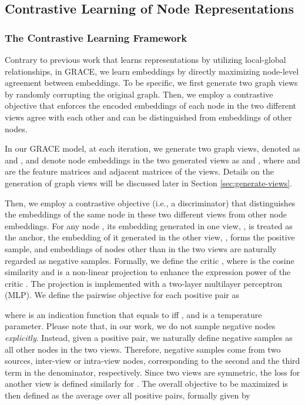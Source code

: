 \documentclass{article}
\theoremstyle{remark}
\begin{document}
\subsection{Contrastive Learning of Node Representations}

\subsubsection{The Contrastive Learning Framework} 

Contrary to previous work that learns representations by utilizing local-global relationships, in GRACE, we learn embeddings by directly maximizing node-level agreement between embeddings.
To be specific, we first generate two graph views by randomly corrupting the original graph. Then, we employ a contrastive objective that enforces the encoded embeddings of each node in the two different views agree with each other and can be distinguished from embeddings of other nodes.





In our GRACE model, at each iteration, we generate two graph views, denoted as  and , and denote node embeddings in the two generated views as  and , where  and  are the feature matrices and adjacent matrices of the views.
Details on the generation of graph views will be discussed later in Section \ref{sec:generate-views}.



Then, we employ a contrastive objective (i.e., a discriminator) that distinguishes the embeddings of the same node in these two different views from other node embeddings. For any node , its embedding generated in one view, , is treated as the anchor, the embedding of it generated in the other view, , forms the positive sample, and embeddings of nodes other than  in the two views are naturally regarded as negative samples. Formally, we define the critic , where  is the cosine similarity and  is a non-linear projection to enhance the expression power of the critic \cite{Chen:2020wj,Tschannen:2020uo}. The projection  is implemented with a two-layer multilayer perceptron (MLP). We define the pairwise objective for each positive pair  as

where  is an indication function that equals to  iff , and  is a temperature parameter. Please note that, in our work, we do not sample negative nodes \emph{explicitly}. Instead, given a positive pair, we naturally define negative samples as all other nodes in the two views. Therefore, negative samples come from two sources, inter-view or intra-view nodes, corresponding to the second and the third term in the denominator, respectively. Since two views are symmetric, the loss for another view is defined similarly for . 
The overall objective to be maximized is then defined as the average over all positive pairs, formally given by
\end{document}
